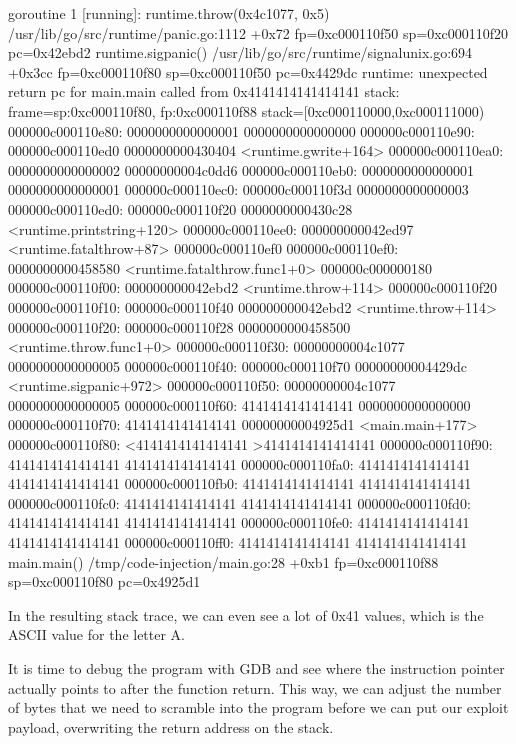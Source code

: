 goroutine 1 [running]:
runtime.throw(0x4c1077, 0x5)
/usr/lib/go/src/runtime/panic.go:1112 +0x72 fp=0xc000110f50 sp=0xc000110f20 pc=0x42ebd2
runtime.sigpanic()
/usr/lib/go/src/runtime/signalunix.go:694 +0x3cc fp=0xc000110f80 sp=0xc000110f50 pc=0x4429dc
runtime: unexpected return pc for main.main called from 0x4141414141414141
stack: frame=sp:0xc000110f80, fp:0xc000110f88 stack=[0xc000110000,0xc000111000)
    000000c000110e80:  0000000000000001  0000000000000000
    000000c000110e90:  000000c000110ed0  0000000000430404 <runtime.gwrite+164>
    000000c000110ea0:  0000000000000002  00000000004c0dd6
    000000c000110eb0:  0000000000000001  0000000000000001
    000000c000110ec0:  000000c000110f3d  0000000000000003
    000000c000110ed0:  000000c000110f20  0000000000430c28 <runtime.printstring+120>
    000000c000110ee0:  000000000042ed97 <runtime.fatalthrow+87>  000000c000110ef0
    000000c000110ef0:  0000000000458580 <runtime.fatalthrow.func1+0>  000000c000000180
    000000c000110f00:  000000000042ebd2 <runtime.throw+114>  000000c000110f20
    000000c000110f10:  000000c000110f40  000000000042ebd2 <runtime.throw+114>
    000000c000110f20:  000000c000110f28  0000000000458500 <runtime.throw.func1+0>
    000000c000110f30:  00000000004c1077  0000000000000005
    000000c000110f40:  000000c000110f70  00000000004429dc <runtime.sigpanic+972>
    000000c000110f50:  00000000004c1077  0000000000000005
    000000c000110f60:  4141414141414141  0000000000000000
    000000c000110f70:  4141414141414141  00000000004925d1 <main.main+177>
    000000c000110f80: <4141414141414141 >4141414141414141
    000000c000110f90:  4141414141414141  4141414141414141
    000000c000110fa0:  4141414141414141  4141414141414141
    000000c000110fb0:  4141414141414141  4141414141414141
    000000c000110fc0:  4141414141414141  4141414141414141
    000000c000110fd0:  4141414141414141  4141414141414141
    000000c000110fe0:  4141414141414141  4141414141414141
    000000c000110ff0:  4141414141414141  4141414141414141
    main.main()
    /tmp/code-injection/main.go:28 +0xb1 fp=0xc000110f88 sp=0xc000110f80 pc=0x4925d1


    In the resulting stack trace, we can even see a lot of 0x41 values, which is the ASCII value for the letter A.

    It is time to debug the program with GDB and see where the instruction pointer actually points to after the function
    return. This way, we can adjust the number of bytes that we need to scramble into the program before we can put our
    exploit payload, overwriting the return address on the stack.

